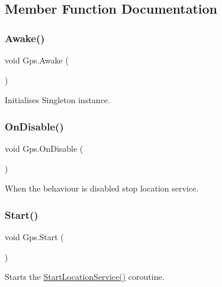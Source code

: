 \subsection{Member Function Documentation}
\mbox{\label{class_gps_a13244891c04234f5c7351779bfa20bae}} 
\subsubsection{\texorpdfstring{Awake()}{Awake()}}
{\footnotesize\ttfamily void Gps.\+Awake (\begin{DoxyParamCaption}{ }\end{DoxyParamCaption})\hspace{0.3cm}{\ttfamily [private]}}



Initialises Singleton instance. 

\mbox{\label{class_gps_a8bbfefeb0421b171d4ee9f7abf0474aa}} 
\subsubsection{\texorpdfstring{OnDisable()}{OnDisable()}}
{\footnotesize\ttfamily void Gps.\+On\+Disable (\begin{DoxyParamCaption}{ }\end{DoxyParamCaption})\hspace{0.3cm}{\ttfamily [private]}}



When the behaviour is disabled stop location service. 

\mbox{\label{class_gps_a18ae27d5aa990af06a42dd8d44f188ee}} 
\subsubsection{\texorpdfstring{Start()}{Start()}}
{\footnotesize\ttfamily void Gps.\+Start (\begin{DoxyParamCaption}{ }\end{DoxyParamCaption})\hspace{0.3cm}{\ttfamily [private]}}



Starts the \mbox{\hyperlink{class_gps_aa67e567c766cc77fa070956e39ff9f73}{Start\+Location\+Service()}} coroutine. 

